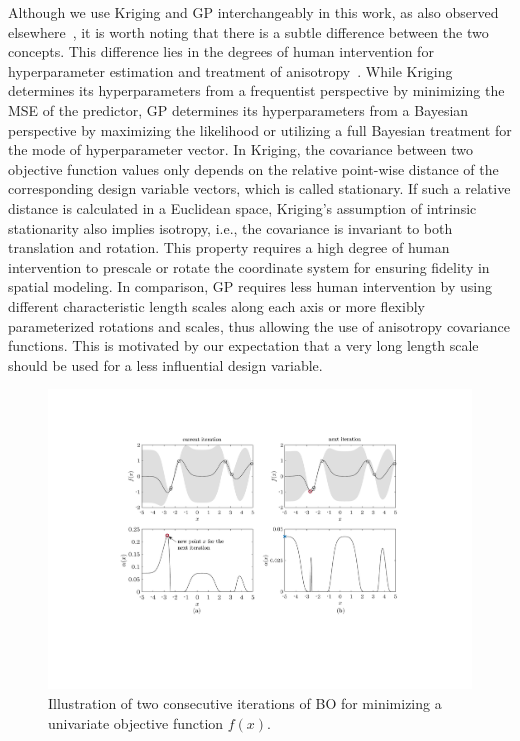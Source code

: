 \documentclass[iicol,sn-basic]{sn-jnl}%
\newcommand{\edit}[1]{\textcolor{red}{#1}} %
\begin{document}
Although we use Kriging and GP interchangeably in this work, as also observed elsewhere~\citep[see e.g.,][]{Forrester2008,Erickson2018}, it is worth noting that there is a subtle difference between the two concepts.
This difference lies in the degrees of human intervention for hyperparameter estimation and treatment of anisotropy~\citep{Christianson2023}.
While Kriging determines its hyperparameters from a frequentist perspective by minimizing the MSE of the predictor, GP determines its hyperparameters from a Bayesian perspective by maximizing the likelihood or utilizing a full Bayesian treatment for the mode of hyperparameter vector.
In Kriging, the covariance between two objective function values only depends on the relative point-wise distance of the corresponding design variable vectors, which is called stationary.
If such a relative distance is calculated in a Euclidean space, Kriging's assumption of intrinsic stationarity also implies isotropy, i.e., the covariance is invariant to both translation and rotation.
This property requires a high degree of human intervention to prescale or rotate the coordinate system for ensuring fidelity in spatial modeling.
In comparison, GP requires less human intervention by using different characteristic length scales along each axis or more flexibly parameterized rotations and scales, thus allowing the use of anisotropy covariance functions.
{This is motivated by our expectation that a very long length scale should be used for a less influential design variable.}

\begin{figure}
	\centering
	\includegraphics[scale=0.82]{Fig5.pdf}
	\caption{ Illustration of two consecutive iterations of BO for minimizing a univariate objective function $f(x)$.}
	\label{Fig-5}
\end{figure}
\end{document}
